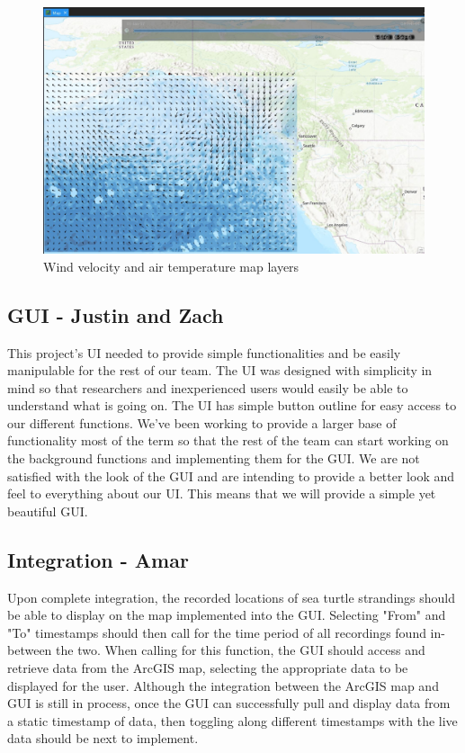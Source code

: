\documentclass[onecolumn, draftclsnofoot,10pt, compsoc]{IEEEtran}
\begin{document}
\begin{figure}[H]
  \includegraphics[scale=0.55]{air_temp_and_wind_current.JPG}
  \caption{Wind velocity and air temperature map layers}
\end{figure}

\subsection{GUI - Justin and Zach}
This project's UI needed to provide simple functionalities and be easily manipulable for the rest of our team. The UI was designed with simplicity in mind so that researchers and inexperienced users would easily be able to understand what is going on. The UI has simple button outline for easy access to our different functions. We've been working to provide a larger base of functionality most of the term so that the rest of the team can start working on the background functions and implementing them for the GUI. We are not satisfied with the look of the GUI and are intending to provide a better look and feel to everything about our UI. This means that we will provide a simple yet beautiful GUI.

\subsection{Integration - Amar}

Upon complete integration, the recorded locations of sea turtle strandings should be able to display on the map implemented into the GUI. Selecting "From" and "To" timestamps should then call for the time period of all recordings found in-between the two. When calling for this function, the GUI should access and retrieve data from the ArcGIS map, selecting the appropriate data to be displayed for the user. Although the integration between the ArcGIS map and GUI is still in process, once the GUI can successfully pull and display data from a static timestamp of data, then toggling along different timestamps with the live data should be next to implement.
\end{document}
